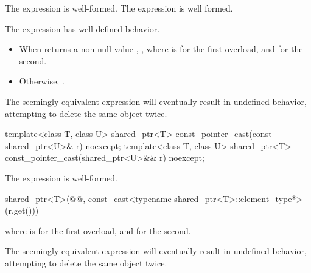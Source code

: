 \begin{itemdescr}
\pnum
\mandates
The expression  is well-formed.
The expression  is well formed.

\pnum
\expects
The expression  has well-defined behavior.

\pnum
\returns
\begin{itemize}
\item When 
  returns a non-null value ,
  ,
  where  is  for the first overload, and
   for the second.
\item Otherwise, .
\end{itemize}

\pnum
\begin{note}
The seemingly equivalent expression
 will eventually result in
undefined behavior, attempting to delete the same object twice.
\end{note}
\end{itemdescr}

%
\begin{itemdecl}
template<class T, class U>
  shared_ptr<T> const_pointer_cast(const shared_ptr<U>& r) noexcept;
template<class T, class U>
  shared_ptr<T> const_pointer_cast(shared_ptr<U>&& r) noexcept;
\end{itemdecl}

\begin{itemdescr}
\pnum
\mandates
The expression  is well-formed.

\pnum
\returns
\begin{codeblock}
shared_ptr<T>(@@, const_cast<typename shared_ptr<T>::element_type*>(r.get()))
\end{codeblock}
where  is  for the first overload, and
 for the second.

\pnum
\begin{note}
The seemingly equivalent expression
 will eventually result in
undefined behavior, attempting to delete the same object twice.
\end{note}
\end{itemdescr}

